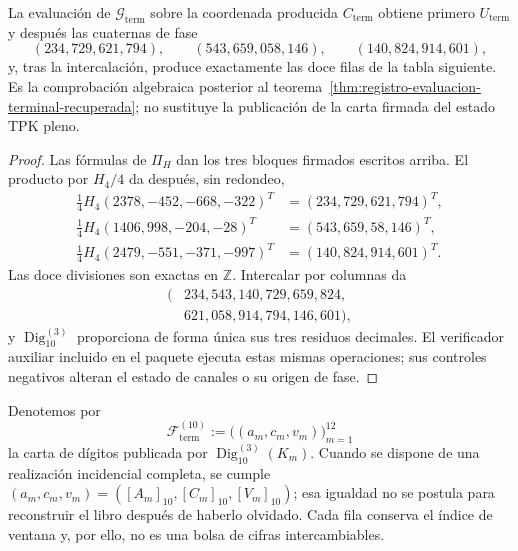 \begin{proposition}
\label{prop:registro-generacion-modular-terminal}
La evaluación de \(\mathcal G_{\mathrm{term}}\) sobre la coordenada producida
\(C_{\mathrm{term}}\) obtiene primero \(U_{\mathrm{term}}\) y después las
cuaternas de fase
\[
 (234,729,621,794),\qquad(543,659,058,146),\qquad
 (140,824,914,601),
\]
y, tras la intercalación, produce exactamente las doce filas de la tabla
siguiente. Es la comprobación algebraica posterior al
teorema~\ref{thm:registro-evaluacion-terminal-recuperada}; no sustituye la
publicación de la carta firmada del estado TPK pleno.
\end{proposition}

\begin{proof}
Las fórmulas de \(\Pi_H\) dan los tres bloques firmados escritos arriba. El
producto por \(H_4/4\) da después, sin redondeo,
\begin{align*}
 \tfrac14H_4(2378,-452,-668,-322)^T&=(234,729,621,794)^T,\\
 \tfrac14H_4(1406,998,-204,-28)^T&=(543,659,58,146)^T,\\
 \tfrac14H_4(2479,-551,-371,-997)^T&=(140,824,914,601)^T.
\end{align*}
Las doce divisiones son exactas en \(\mathbb Z\). Intercalar por columnas da
\[
 \begin{split}
 (&234,543,140,729,659,824,\\
  &621,058,914,794,146,601),
 \end{split}
\]
y \(\operatorname{Dig}_{10}^{(3)}\) proporciona de forma única sus tres
residuos decimales. El verificador auxiliar incluido en el paquete ejecuta
estas mismas operaciones; sus controles negativos alteran el estado de canales
o su origen de fase.
\end{proof}

Denotemos por
\[
 \mathscr F_{\mathrm{term}}^{(10)}
 :=\bigl((a_m,c_m,v_m)\bigr)_{m=1}^{12}
\]
la carta de dígitos publicada por \(\operatorname{Dig}_{10}^{(3)}(K_m)\).
Cuando se dispone de una realización incidencial completa, se cumple
\((a_m,c_m,v_m)=([A_m]_{10},[C_m]_{10},[V_m]_{10})\); esa igualdad no se
postula para reconstruir el libro después de haberlo olvidado. Cada fila
conserva el índice de ventana y, por ello, no es una bolsa de cifras
intercambiables.

